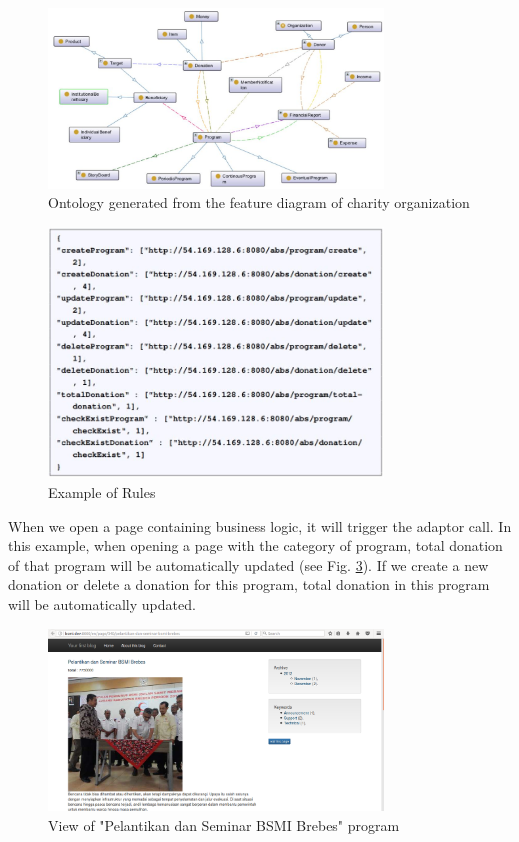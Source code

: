 \documentclass[conference]{IEEEtran}
\begin{document}
\begin{figure}[!t]
\centering
\includegraphics[width=3.5in]{aisco}

\caption{Ontology generated from the feature diagram of charity organization}
\label{fig_ontaisco}
\end{figure}

\begin{figure}[!t]
\centering
\includegraphics[width=3.5in]{Rules}

\caption{Example of Rules}
\label{fig_rules}
\end{figure}

When we open a page containing business logic, it will trigger the adaptor call. In this example, when opening a page with the category of program, total donation of that program will be automatically updated (see Fig. \ref{view_program}). If we create a new donation or delete a donation for this program, total donation in this program will be automatically updated.

\begin{figure}[h]
	\centering
	\includegraphics[width=3.5in]{19-viewProgram}
	
	\caption{View of "Pelantikan dan Seminar BSMI Brebes" program}
	\label{view_program}
\end{figure}
\end{document}
